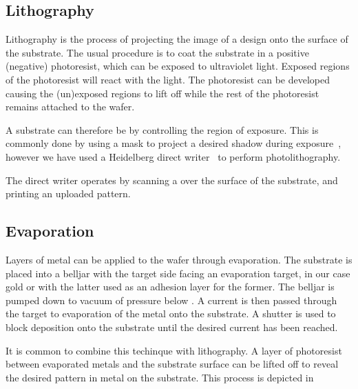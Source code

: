 \subsection{Lithography}

Lithography is the process of projecting the image of a design onto the surface
of the substrate. The usual procedure is to coat the substrate in a positive
(negative)  photoresist, which can be exposed to ultraviolet
light. Exposed regions of the photoresist will react with the light. The
photoresist can be developed causing the (un)exposed regions to lift off while
the rest of the photoresist remains attached to the wafer.

A substrate can therefore be  by controlling the region of
exposure. This is commonly done by using a mask to project a desired shadow
during exposure~\cite{}, however we have used a Heidelberg direct
writer~\cite{} to perform photolithography.

The direct writer operates by scanning a  over the surface of the
substrate, and printing an uploaded pattern.


\subsection{Evaporation}

Layers of metal can be applied to the wafer through evaporation. The substrate
is placed into a belljar 
with the target side facing an evaporation target, in our case gold or
 with the latter used as an adhesion layer for the former. The
belljar is pumped down to vacuum of pressure below . A current is then
passed through the target to  evaporation of the metal onto the
substrate. A shutter is used to block deposition onto the substrate until the
desired current has been reached.

It is common to combine this techinque with lithography. A layer of photoresist
between evaporated metals and the substrate surface can be lifted off to reveal
the desired pattern in metal on the substrate.  This process is
depicted in 

\begin{figure}
  \caption{}
  \label{fab:fig:photolith}
\end{figure}

